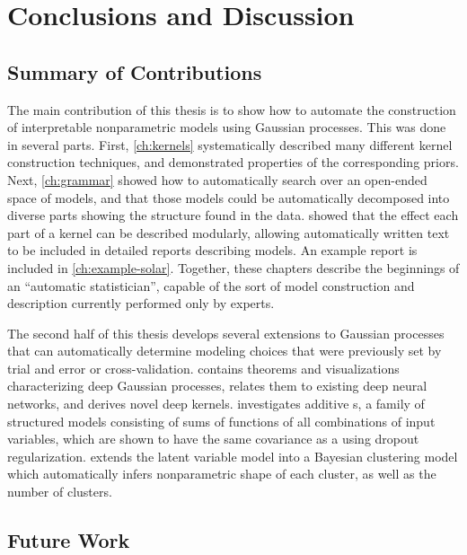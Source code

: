
\inbpdocument

\chapter{Conclusions and Discussion}
\label{ch:discussion}


\section{Summary of Contributions}

The main contribution of this thesis is to show how to automate the construction of interpretable nonparametric models using Gaussian processes.
This was done in several parts.
First, \cref{ch:kernels} systematically described many different kernel construction techniques, and demonstrated properties of the corresponding \gp{} priors.
Next, \cref{ch:grammar} showed how to automatically search over an open-ended space of \gp{} models, and that those models could be automatically decomposed into diverse parts showing the structure found in the data.
 showed that the effect each part of a kernel can be described modularly, allowing automatically written text to be included in detailed reports describing \gp{} models.
An example report is included in \cref{ch:example-solar}.
Together, these chapters describe the beginnings of an ``automatic statistician'', capable of the sort of model construction and description currently performed only by experts.

The second half of this thesis develops several extensions to Gaussian processes that can automatically determine modeling choices that were previously set by trial and error or cross-validation.
 contains theorems and visualizations characterizing deep Gaussian processes, relates them to existing deep neural networks, and derives novel deep kernels.
 investigates additive \gp{}s, a family of structured models consisting of sums of functions of all combinations of input variables, which are shown to have the same covariance as a \gp{} using dropout regularization.
 extends the \gp{} latent variable model into a Bayesian clustering model which automatically infers nonparametric shape of each cluster, as well as the number of clusters.


\section{Future Work}

